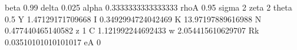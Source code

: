 beta 0.99
delta 0.025
alpha 0.3333333333333333
rhoA 0.95
sigma 2
zeta 2
theta 0.5
Y 1.47129171709668
I 0.3492994724042469
K 13.97197889616988
N 0.477440465140582
z 1
C 1.121992244692433
w 2.054415610629707
Rk 0.03510101010101017
eA 0
